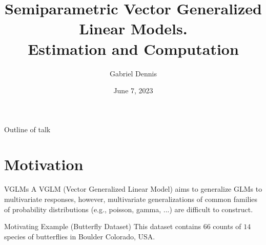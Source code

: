 \documentclass[9pt,notes=hide]{beamer}
\title{Semiparametric Vector Generalized Linear Models.\\ 
    \small{Estimation and Computation}
}
\author{Gabriel Dennis}
\date{June 7, 2023}
\begin{document}
\maketitle

\begin{frame}{Outline of talk}
	\tableofcontents
\end{frame}
\note[enumerate]{
}


\section{Motivation}

\begin{frame}{VGLMs}
	A VGLM (Vector Generalized Linear Model)  aims to generalize GLMs to
	multivariate responses, however,  multivariate generalizations of common
	families of probability distributions (e.g., poisson, gamma, ...) are
	difficult to construct.
\end{frame}

\begin{frame}{Motivating Example (Butterfly Dataset)}
	This dataset contains $66$  counts of  $14$ species of butterflies in
	Boulder Colorado, USA. \\
	\begin{table}
		\centering
		\caption{Snippet of Butterfly Counts for the $3$ most common species \parencite{Hui2013, 2006Oliver}}
	\end{table}
\end{frame}
\end{document}
